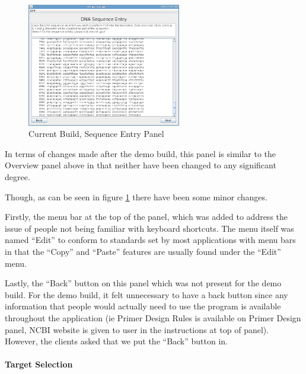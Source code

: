 \begin{figure}[h]
  \begin{center}
    \includegraphics[width=0.6\textwidth]{./images/currentBuild/sequenceEntry.png}
    \caption{
      \label{fig:currentBuild:sequenceEntry}
      Current Build, Sequence Entry Panel
    }
  \end{center}
\end{figure}

In terms of changes made after the demo build, this panel is similar
to the Overview panel above in that neither have been changed to any
significant degree.

Though, as can be seen in figure \ref{fig:currentBuild:sequenceEntry}
there have been some minor changes.

Firstly, the menu bar at the top of the panel, which was added to
address the issue of people not being familiar with keyboard
shortcuts.
The menu itself was named ``Edit'' to conform to standards set by most
applications with menu bars in that the ``Copy'' and ``Paste''
features are usually found under the ``Edit'' menu.

Lastly, the ``Back'' button on this panel which was not present for
the demo build.
For the demo build, it felt unnecessary to have a back button since
any information that people would actually need to use the program is
available throughout the application (ie Primer Design Rules is
available on Primer Design panel, NCBI website is given to user in the
instructions at top of panel).
However, the clients asked that we put the ``Back'' button in.

\paragraph{Target Selection}

